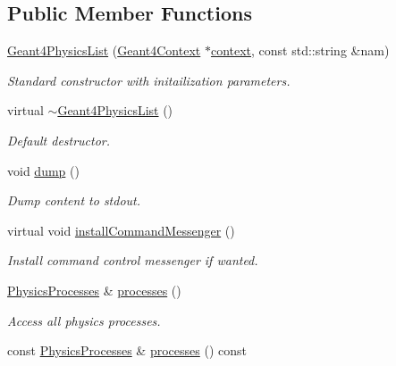 \subsection*{Public Member Functions}
\begin{DoxyCompactItemize}
\item 
\hyperlink{class_d_d4hep_1_1_simulation_1_1_geant4_physics_list_a31c0d4c050c773be8cf95ac34a06eab7}{Geant4\+Physics\+List} (\hyperlink{class_d_d4hep_1_1_simulation_1_1_geant4_context}{Geant4\+Context} $\ast$\hyperlink{class_d_d4hep_1_1_simulation_1_1_geant4_action_aa9d87f0ec2a72b7fc2591b18f98d75cf}{context}, const std\+::string \&nam)
\begin{DoxyCompactList}\small\item\em Standard constructor with initailization parameters. \end{DoxyCompactList}\item 
virtual \hyperlink{class_d_d4hep_1_1_simulation_1_1_geant4_physics_list_a224e107987da2017407996766e9bd445}{$\sim$\+Geant4\+Physics\+List} ()
\begin{DoxyCompactList}\small\item\em Default destructor. \end{DoxyCompactList}\item 
void \hyperlink{class_d_d4hep_1_1_simulation_1_1_geant4_physics_list_a938fd59bb0072ba9c304828aeb6e267b}{dump} ()
\begin{DoxyCompactList}\small\item\em Dump content to stdout. \end{DoxyCompactList}\item 
virtual void \hyperlink{class_d_d4hep_1_1_simulation_1_1_geant4_physics_list_af18b7d6454f56d0aa6e55a2046cff019}{install\+Command\+Messenger} ()
\begin{DoxyCompactList}\small\item\em Install command control messenger if wanted. \end{DoxyCompactList}\item 
\hyperlink{class_d_d4hep_1_1_simulation_1_1_geant4_physics_list_ab41e55687c9d57878fe2e6847a31f19a}{Physics\+Processes} \& \hyperlink{class_d_d4hep_1_1_simulation_1_1_geant4_physics_list_abd2fd72a935c5a809d216026b503e154}{processes} ()
\begin{DoxyCompactList}\small\item\em Access all physics processes. \end{DoxyCompactList}\item 
const \hyperlink{class_d_d4hep_1_1_simulation_1_1_geant4_physics_list_ab41e55687c9d57878fe2e6847a31f19a}{Physics\+Processes} \& \hyperlink{class_d_d4hep_1_1_simulation_1_1_geant4_physics_list_a962da5929e1e970352b314f9e937ac84}{processes} () const

\end{DoxyCompactItemize}
